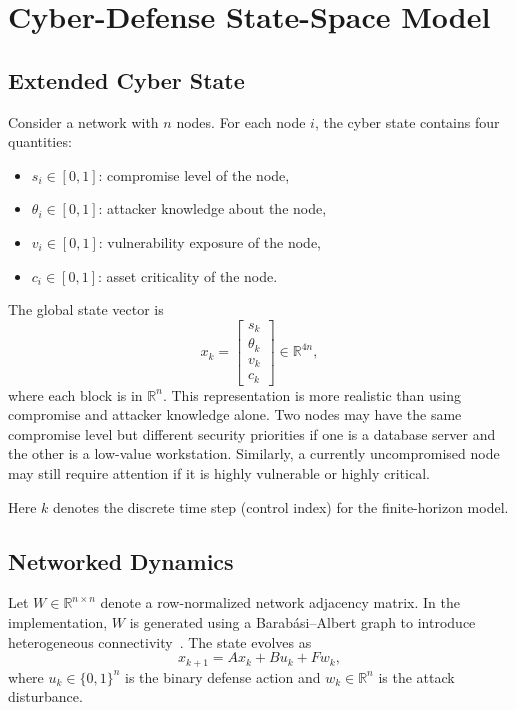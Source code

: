 \documentclass[runningheads]{llncs}
\begin{document}
\section{Cyber-Defense State-Space Model}

\subsection{Extended Cyber State}

Consider a network with $n$ nodes. For each node $i$, the cyber state contains four quantities:
\begin{itemize}
    \item $s_i \in [0,1]$: compromise level of the node,
    \item $\theta_i \in [0,1]$: attacker knowledge about the node,
    \item $v_i \in [0,1]$: vulnerability exposure of the node,
    \item $c_i \in [0,1]$: asset criticality of the node.
\end{itemize}

The global state vector is
\begin{equation}
x_k =
\begin{bmatrix}
s_k\\
\theta_k\\
v_k\\
c_k
\end{bmatrix}
\in \mathbb{R}^{4n},
\end{equation}
where each block is in $\mathbb{R}^{n}$. This representation is more realistic than using compromise and attacker knowledge alone. Two nodes may have the same compromise level but different security priorities if one is a database server and the other is a low-value workstation. Similarly, a currently uncompromised node may still require attention if it is highly vulnerable or highly critical.

Here $k$ denotes the discrete time step (control index) for the finite-horizon model.

\subsection{Networked Dynamics}

Let $W \in \mathbb{R}^{n \times n}$ denote a row-normalized network adjacency matrix. In the implementation, $W$ is generated using a Barab\'asi--Albert graph to introduce heterogeneous connectivity~\cite{barabasi1999scaling}. The state evolves as
\begin{equation}
x_{k+1}=Ax_k+Bu_k+Fw_k,
\label{eq:state}
\end{equation}
where $u_k \in \{0,1\}^{n}$ is the binary defense action and $w_k \in \mathbb{R}^{n}$ is the attack disturbance.
\end{document}
